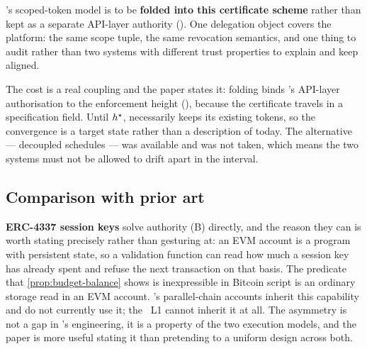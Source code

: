 \begin{remark}
\label{rem:fold-scoped-tokens}
\FluxEdge{}'s scoped-token model is to be \textbf{folded into this certificate scheme} rather than
kept as a separate API-layer authority  (\planned). One
delegation object covers the platform: the same scope tuple, the same revocation semantics, and one
thing to audit rather than two systems with different trust properties to explain and keep aligned.

The cost is a real coupling and the paper states it: folding binds \FluxEdge{}'s API-layer
authorisation to the  enforcement height (), because the certificate
travels in a  specification field. Until $h^{\star}$, \FluxEdge{} necessarily keeps its
existing tokens, so the convergence is a target state rather than a description of today. The
alternative --- decoupled schedules --- was available and was not taken, which means the two systems
must not be allowed to drift apart in the interval.
\end{remark}


\subsection{Comparison with prior art}
\label{sec:agent-identity:compare}

\textbf{ERC-4337 session keys} \citep{erc4337} solve authority (B) directly, and the reason they can
is worth stating precisely rather than gesturing at: an EVM account is a program with persistent
state, so a validation function can read how much a session key has already spent and refuse the next
transaction on that basis. The predicate that \cref{prop:budget-balance} shows is inexpressible in
Bitcoin script is an ordinary storage read in an EVM account. \Flux's parallel-chain accounts inherit
this capability and do not currently use it; the \Flux\ L1 cannot inherit it at all. The asymmetry is
not a gap in \Flux's engineering, it is a property of the two execution models, and the paper is more
useful stating it than pretending to a uniform design across both.

